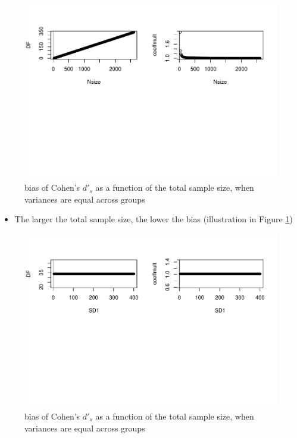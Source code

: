 \documentclass[
  man]{apa6}
\providecommand{\tightlist}{%
  \setlength{\itemsep}{0pt}\setlength{\parskip}{0pt}}
\begin{document}
\begin{figure}
\centering
\includegraphics{Theoretical-Bias-and-variance,-as-a-function-of-population-parameters_files/figure-latex/biascohendprimehetunbalNsize2-1.pdf}
\caption{\label{fig:biascohendprimehetunbalNsize2}bias of Cohen's \(d'_s\) as a function of the total sample size, when variances are equal across groups}
\end{figure}

\begin{itemize}
\tightlist
\item
  The larger the total sample size, the lower the bias (illustration in Figure \ref{fig:biascohendprimehetunbalNsize2})
\end{itemize}

\begin{figure}
\centering
\includegraphics{Theoretical-Bias-and-variance,-as-a-function-of-population-parameters_files/figure-latex/biascohendprimehetunbalvariance2-1.pdf}
\caption{\label{fig:biascohendprimehetunbalvariance2}bias of Cohen's \(d'_s\) as a function of the total sample size, when variances are equal across groups}
\end{figure}
\end{document}
